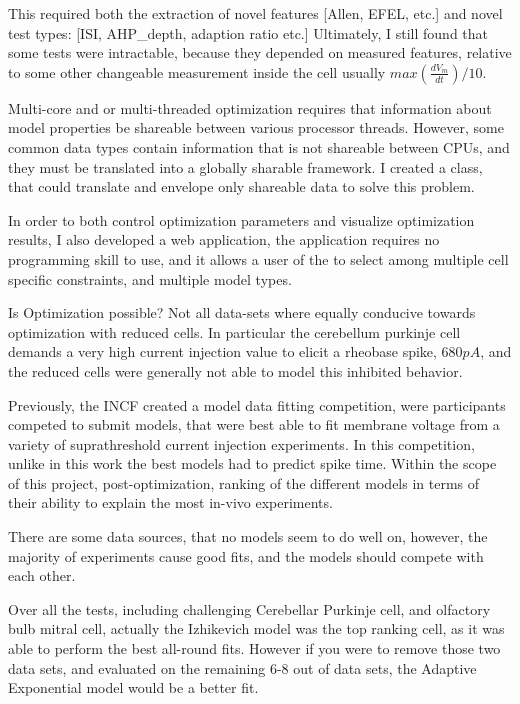 This required both the extraction of novel features [Allen, EFEL, etc.] and novel test types: [ISI, AHP\_depth, adaption ratio etc.] Ultimately, I still found that some tests were intractable, because they depended on measured features, relative to some other changeable measurement inside the cell usually $max(\frac{dV_{m}}{dt})/10.$

Multi-core and or multi-threaded optimization requires that information about model properties be shareable between various processor threads. However, some common data types contain information that is not shareable between CPUs, and they must be translated into a globally sharable framework. I created a class, that could translate and envelope only shareable data to solve this problem.

In order to both control optimization parameters and visualize optimization results, I also developed a web application, the application requires no programming skill to use, and it allows a user of the to select among multiple cell specific constraints, and multiple model types. 
%


Is Optimization possible?
Not all data-sets where equally conducive towards optimization with reduced cells. In particular the cerebellum purkinje cell demands a very high current injection value to elicit a rheobase spike, $680pA$, and the reduced cells were generally not able to model this inhibited behavior.

Previously, the INCF created a model data fitting competition, were participants competed to submit models, that were best able to fit membrane voltage from a variety of suprathreshold current injection experiments. In this competition, unlike in this work the best models had to predict spike time. Within the scope of this project, post-optimization, ranking of the different models in terms of their ability to explain the most in-vivo experiments. 

There are some data sources, that no models seem to do well on, however, the majority of experiments cause good fits, and the models should compete with each other.

Over all the tests, including challenging Cerebellar Purkinje cell, and olfactory bulb mitral cell, actually the Izhikevich model was the top ranking cell, as it was able to perform the best all-round fits. However if you were to remove those two data sets, and evaluated on the remaining 6-8 out of data sets, the Adaptive Exponential model would be a better fit.



